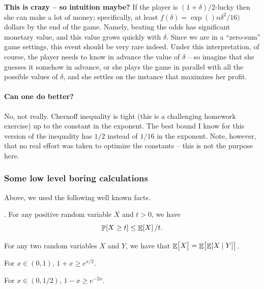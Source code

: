 \medskip%
\noindent%
\textbf{This is crazy -- so intuition maybe?} %
If the player is $(1+\delta)/2$-lucky then she can make a lot of
money; specifically, at least $f(\delta)=\exp()n \delta^2 / 16)$
dollars by the end of the game. Namely, beating the odds has
significant monetary value, and this value grows quickly with
$\delta$. Since we are in a ``zero-sum'' game settings, this event
should be very rare indeed. Under this interpretation, of course, the
player needs to know in advance the value of $\delta$ -- so imagine
that she guesses it somehow in advance, or she plays the game in
parallel with all the possible values of $\delta$, and she settles on
the instance that maximizes her profit.

\paragraph*{Can one do better?}
No, not really. Chernoff inequality is tight (this is a challenging
homework exercise) up to the constant in the exponent. The best bound
I know for this version of the inequality has $1/2$ instead of $1/16$
in the exponent. Note, however, that no real effort was taken to
optimize the constants -- this is not the purpose here.



\subsubsection{Some low level boring calculations}

Above, we used the following well known facts.
\begin{lemma}
    \begin{compactenumA}[label=(\Alph*)]
        \item {}. For any positive random variable
        $X$ and $t > 0$, we have
        \begin{equation*}
            \Prob{X \geq t} \leq \Ex{X}/t.
        \end{equation*}

        \item For any two random variables $X$ and $Y$, we have that
        $\mathop{\mathbb{E}}\!\left[ {\bigl. X} \right] = \mathop{\mathbb{E}}\!\left[ {  \mathop{\mathbb{E}}\!\left[ { X \mid  Y } \right]\bigr.} \right]$.
        \item For $x \in (0,1)$, $1+x \geq e^{x/2}$.

        \item For $x \in (0,1/2)$, $1-x \geq e^{-2x}$.
    \end{compactenumA}
\end{lemma}

